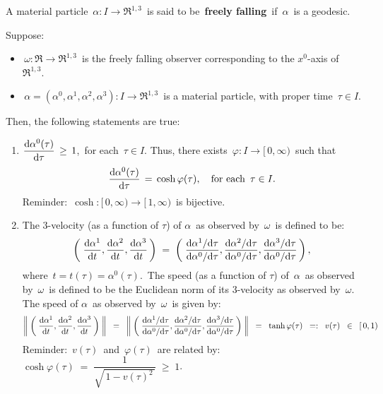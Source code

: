 \begin{definition}
\mbox{}
\vskip -0.01cm
\noindent
A material particle
\,$\alpha : I \longrightarrow \Re^{1,3}$\,
is said to be \,\textbf{freely falling}\,
if \,$\alpha$\, is a geodesic.
\end{definition}


\vskip 0.5cm
\begin{proposition}
\mbox{}
\vskip -0.01cm
\noindent
Suppose:
\begin{itemize}
\item
	\,$\omega : \Re \longrightarrow \Re^{1,3}$\, is the freely falling observer
	corresponding to the $x^{0}$-axis of \,$\Re^{1,3}$.\,
\item
	\,$\alpha = (\alpha^{0},\alpha^{1},\alpha^{2},\alpha^{3}) : I \longrightarrow \Re^{1,3}$\, is a material particle,
	with proper time \,$\tau \in I$.
\end{itemize}
Then, the following statements are true:
\begin{enumerate}
\item
	$\dfrac{\textnormal{d}\alpha^{0}(\tau)}{\textnormal{d}\tau} \,\geq\, 1$,\, for each \,$\tau \in I$.
	Thus, there exists \,$\varphi : I \longrightarrow [\,0,\infty)$\,
	such that
	\begin{equation*}
	\dfrac{\textnormal{d}\alpha^{0}(\tau)}{\textnormal{d}\tau} \, = \, \cosh\varphi(\tau),
	\quad
	\textnormal{for each \,$\tau \in I$}.
	\end{equation*}
	Reminder: \,$\cosh : [\,0,\infty) \longrightarrow [\,1,\infty)$\, is bijective.
\item
	The $3$-velocity (as a function of $\tau$) of \;$\alpha$\, as observed by \,$\omega$\, is {\color{red}defined} to be:
	\begin{equation*}
	\left(\;
		\dfrac{\textnormal{d}\alpha^{1}}{\textnormal{d} t},
		\dfrac{\textnormal{d}\alpha^{2}}{\textnormal{d} t},
		\dfrac{\textnormal{d}\alpha^{3}}{\textnormal{d} t}
		\,\right)
	\; = \;
	\left(\;
		\dfrac{\textnormal{d}\alpha^{1}/\textnormal{d}\tau}{\textnormal{d}\alpha^{0}/\textnormal{d}\tau},
		\dfrac{\textnormal{d}\alpha^{2}/\textnormal{d}\tau}{\textnormal{d}\alpha^{0}/\textnormal{d}\tau},
		\dfrac{\textnormal{d}\alpha^{3}/\textnormal{d}\tau}{\textnormal{d}\alpha^{0}/\textnormal{d}\tau}
		\,\right),
	\end{equation*}
	where \,$t = t(\tau) = \alpha^{0}(\tau)$.\,
	The speed (as a function of $\tau$) of \,$\alpha$\, as observed by \,$\omega$\, is defined to be
	the Euclidean norm of its 3-velocity as observed by \,$\omega$.\,
	The speed of \;$\alpha$\, as observed by \,$\omega$\, is given by:
	\begin{equation*}
	\left\Vert\;\left(\;
		\dfrac{\textnormal{d}\alpha^{1}}{\textnormal{d} t},
		\dfrac{\textnormal{d}\alpha^{2}}{\textnormal{d} t},
		\dfrac{\textnormal{d}\alpha^{3}}{\textnormal{d} t}
		\,\right)\;\right\Vert
	\;\; = \;\;
	\left\Vert\;\left(\;
		\dfrac{\textnormal{d}\alpha^{1}/\textnormal{d}\tau}{\textnormal{d}\alpha^{0}/\textnormal{d}\tau},
		\dfrac{\textnormal{d}\alpha^{2}/\textnormal{d}\tau}{\textnormal{d}\alpha^{0}/\textnormal{d}\tau},
		\dfrac{\textnormal{d}\alpha^{3}/\textnormal{d}\tau}{\textnormal{d}\alpha^{0}/\textnormal{d}\tau}
		\,\right)\;\right\Vert
	\;\; = \;\;
		\tanh\varphi(\tau)
	\;\; =: \;\;
		v(\tau)
	\;\; \in \;\;
		[\,0,1)
	\end{equation*}
	Reminder: \,$v(\tau)$\, and \,$\varphi(\tau)$\, are related by:
	\,$\cosh\varphi(\tau) \; = \; \dfrac{1}{\sqrt{\,1 - v(\tau)^{2}\,}} \; \geq \; 1$.
\end{enumerate}
\end{proposition}
